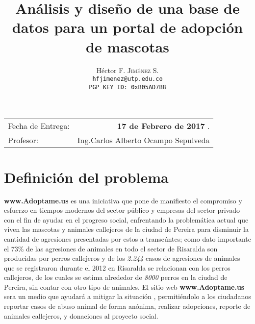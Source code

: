 \documentclass[paper=a4, fontsize=12pt]{article} 		%
\title{Análisis y diseño de una base de datos para un portal de adopción de mascotas} 			%
\author{												%
Héctor F. \textsc{Jiménez S.}\\
\texttt{hfjimenez@utp.edu.co} \\
\texttt{PGP KEY ID: 0xB05AD7B8}
} 												       %
\date{}    						                       %
\numberwithin{equation}{section}						%
\numberwithin{table}{section} 							%
\begin{document}
\maketitle                      			           %
\begin{center}
\begin{tabular}{l r}								   %
Fecha de Entrega: & \textbf{17 de Febrero de 2017} . \\				   	
Profesor: & Ing.Carlos Alberto Ocampo Sepulveda
\end{tabular}
\end{center}
\section{Definición del problema}
\textbf{www.Adoptame.us} es una iniciativa que pone de manifiesto el compromiso y esfuerzo en tiempos modernos del sector público y empresas del sector privado con el fin de ayudar en el progreso social, enfrentando la problemática actual que viven las mascotas  y animales callejeros de la ciudad de Pereira para disminuir la cantidad de agresiones presentadas por estos a transeúntes; como dato importante el 73\% de las agresiones de animales en todo el sector de Risaralda son producidas por perros callejeros y de los \emph{2.244} casos de agresiones de animales que se registraron durante el 2012 en Risaralda se relacionan con los perros callejeros, de los cuales se estima alrededor de \emph{8000} perros en la ciudad de Pereira, sin contar con otro tipo de animales. El sitio web \textbf{www.Adoptame.us} sera un medio que ayudará a mitigar la situación , permitiéndolo a los ciudadanos reportar casos de abuso animal de forma anónima, realizar adopciones, reporte de animales callejeros, y donaciones al proyecto social. 
\end{document}
